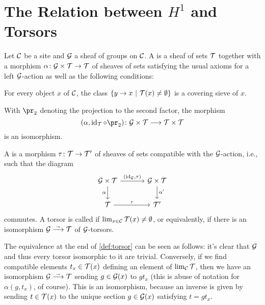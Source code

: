 \documentclass[a4paper, 10pt, oneside, DIV=9, chapterprefix=true, numbers=enddot, bibliography=totoc]{scrbook}
\begin{document}
\section{The Relation between \texorpdfstring{$H^1$}{H1} and Torsors}\label{sec:torsors}
\begin{defi}\label{def:torsor}
	Let $\mathcal{C}$ be a site and $\mathcal{G}$ a sheaf of groups on $\mathcal{C}$. A  is a sheaf of sets $\mathcal{T}$ together with a morphism $\alpha\colon \Gg\times \Tt\morphism \Tt$ of sheaves of sets satisfying the usual axioms for a left $\mathcal{G}$-action as well as the following conditions:
	\begin{alphanumerate}
		\item For every object $x$ of $\mathcal{C}$, the class $\left\{y\morphism x\st \Tt(x)\neq \emptyset\right\}$ is a covering sieve of $x$.
		\item With $\pr_2$ denoting the projection to the second factor, the morphism
		\begin{equation*}
			(\alpha,\id_\Tt\circ \pr_2)\colon \Gg\times \Tt\morphism \Tt\times\Tt
		\end{equation*}
		is an isomorphism.
	\end{alphanumerate}
	A  is a morphism $\tau\colon \Tt\morphism \Tt'$ of sheaves of sets compatible with the $\mathcal{G}$-action, i.e., such that the diagram
	\begin{equation*}
		\begin{tikzcd}
			\Gg\times \Tt\dar["\alpha"'] \rar["{(\id_\Gg,\tau)}"] &[1em] \Gg\times \Tt\dar["\smash{\alpha'}\vphantom{\alpha}"]\\
			\Tt\rar["\tau"] &[1em] \Tt'
		\end{tikzcd}
	\end{equation*}
	commutes. A torsor is called  if $\operatorname*{lim}_{x\in \mathcal{C}}\mathcal{T}(x)\neq \emptyset$, or equivalently, if there is an isomorphism $\Gg\isomorphism \Tt$ of $\mathcal{G}$-torsors.
\end{defi}
\begin{rem}
	The equivalence at the end of \cref{def:torsor} can be seen as follows: it's clear that $\mathcal{G}$ and thus every torsor isomorphic to it are trivial. Conversely, if we find compatible elements $t_x\in \mathcal{T}(x)$ defining an element of $\operatorname*{lim}_{\mathcal{C}}\mathcal{T}$, then we have an isomorphism $\Gg\isomorphism \Tt$ sending $g\in \mathcal{G}(x)$ to $gt_x$ (this is abuse of notation for $\alpha(g,t_x)$, of course). This is an isomorphism, because an inverse is given by sending $t\in \mathcal{T}(x)$ to the unique section $g\in \mathcal{G}(x)$ satisfying $t=gt_x$.
\end{rem}
\end{document}
